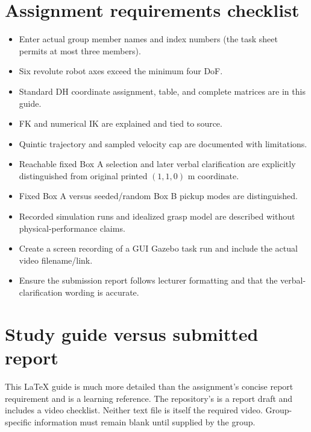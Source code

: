 \section{Assignment requirements checklist}
\begin{itemize}
 \item[$\square$] Enter actual group member names and index numbers (the
 task sheet permits at most three members).
 \item[$\checkmark$] Six revolute robot axes exceed the minimum four DoF.
 \item[$\checkmark$] Standard DH coordinate assignment, table, and complete
 matrices are in this guide.
 \item[$\checkmark$] FK and numerical IK are explained and tied to source.
 \item[$\checkmark$] Quintic trajectory and sampled velocity cap are
 documented with limitations.
 \item[$\checkmark$] Reachable fixed Box A selection and later verbal
 clarification are explicitly distinguished from original printed
 $(1,1,0)$ m coordinate.
 \item[$\checkmark$] Fixed Box A versus seeded/random Box B pickup modes are
 distinguished.
 \item[$\checkmark$] Recorded simulation runs and idealized grasp model are
 described without physical-performance claims.
 \item[$\square$] Create a screen recording of a GUI Gazebo task run and
 include the actual video filename/link.
 \item[$\square$] Ensure the submission report follows lecturer formatting
 and that the verbal-clarification wording is accurate.
\end{itemize}

\section{Study guide versus submitted report}
This LaTeX guide is much more detailed than the assignment's concise report
requirement and is a learning reference. The repository's
 is a report draft and includes a video checklist.
Neither text file is itself the required video. Group-specific information
must remain blank until supplied by the group.
